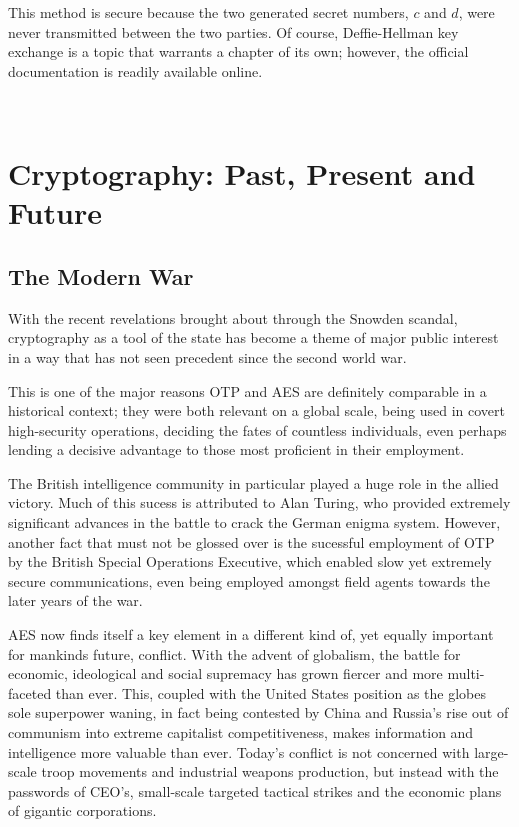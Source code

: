 \documentclass[12pt, a4paper]{report}
\theoremstyle{definition}
\theoremstyle{remark}
\begin{document}
This method is secure because the two generated secret numbers, $c$ and $d$, were never transmitted between the two parties. Of course, Deffie-Hellman key exchange is a topic that warrants a chapter of its own; however, the official documentation is readily available online\cite{NewDirections}.

\hfill \\

\section{Cryptography: Past, Present and Future}

\subsection{The Modern War}
With the recent revelations brought about through the Snowden scandal\cite{Snowden}, cryptography as a tool of the state has become a theme of major public interest in a way that has not seen precedent since the second world war.

This is one of the major reasons OTP and AES are definitely comparable in a historical context; they were both relevant on a global scale, being used in covert high-security operations, deciding the fates of countless individuals, even perhaps lending a decisive advantage to those most proficient in their employment.

The British intelligence community in particular played a huge role in the allied victory. Much of this sucess is attributed to Alan Turing, who provided extremely significant advances in the battle to crack the German enigma system\cite{AlanTuring}. However, another fact that must not be glossed over is the sucessful employment of OTP by the British Special Operations Executive, which enabled slow yet extremely secure communications, even being employed amongst field agents towards the later years of the war.

AES now finds itself a key element in a different kind of, yet equally important for mankinds future, conflict. With the advent of globalism, the battle for economic, ideological and social supremacy has grown fiercer and more multi-faceted than ever. This, coupled with the United States position as the globes sole superpower waning, in fact being contested by China and Russia's rise out of communism into extreme capitalist competitiveness, makes information and intelligence more valuable than ever. Today's conflict is not concerned with large-scale troop movements and industrial weapons production, but instead with the passwords of CEO's, small-scale targeted tactical strikes and the economic plans of gigantic corporations.
\end{document}
